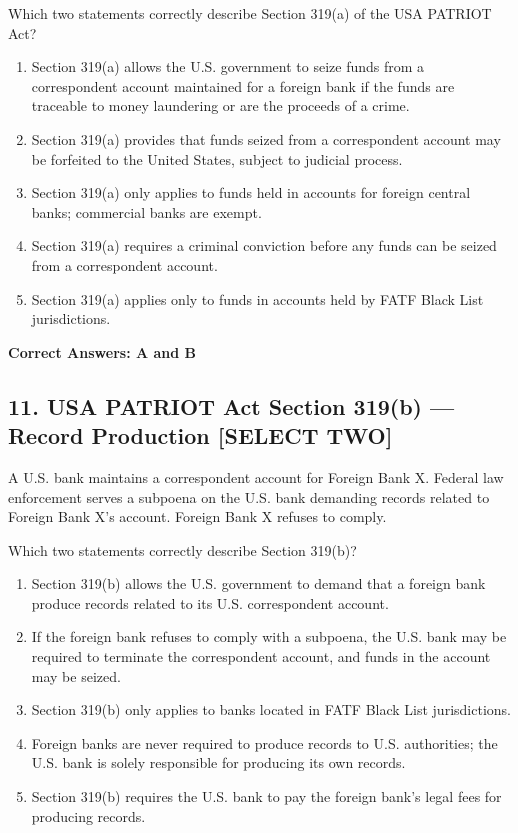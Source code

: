 \documentclass[11pt,a4paper]{article}
\begin{document}
	Which two statements correctly describe Section 319(a) of the USA PATRIOT Act?
	
	\begin{enumerate}[label=\Alph*.]
		\item Section 319(a) allows the U.S. government to seize funds from a correspondent account maintained for a foreign bank if the funds are traceable to money laundering or are the proceeds of a crime.
		\item Section 319(a) provides that funds seized from a correspondent account may be forfeited to the United States, subject to judicial process.
		\item Section 319(a) only applies to funds held in accounts for foreign central banks; commercial banks are exempt.
		\item Section 319(a) requires a criminal conviction before any funds can be seized from a correspondent account.
		\item Section 319(a) applies only to funds in accounts held by FATF Black List jurisdictions.
	\end{enumerate}
	
	\textbf{Correct Answers: A and B}
	
	\subsection{11. USA PATRIOT Act Section 319(b) — Record Production \textnormal{[SELECT TWO]}}
	
	A U.S. bank maintains a correspondent account for Foreign Bank X. Federal law enforcement serves a subpoena on the U.S. bank demanding records related to Foreign Bank X's account. Foreign Bank X refuses to comply.
	
	Which two statements correctly describe Section 319(b)?
	
	\begin{enumerate}[label=\Alph*.]
		\item Section 319(b) allows the U.S. government to demand that a foreign bank produce records related to its U.S. correspondent account.
		\item If the foreign bank refuses to comply with a subpoena, the U.S. bank may be required to terminate the correspondent account, and funds in the account may be seized.
		\item Section 319(b) only applies to banks located in FATF Black List jurisdictions.
		\item Foreign banks are never required to produce records to U.S. authorities; the U.S. bank is solely responsible for producing its own records.
		\item Section 319(b) requires the U.S. bank to pay the foreign bank's legal fees for producing records.
	\end{enumerate}
	
\end{document}
